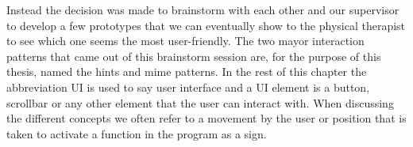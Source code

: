 
Instead the decision was made to brainstorm with each other and our supervisor to develop a few prototypes that we can eventually show to the physical therapist to see which one seems the most user-friendly. The two mayor interaction patterns that came out of this brainstorm session are, for the purpose of this thesis, named the hints and mime patterns. In the rest of this chapter the abbreviation UI is used to say user interface and a UI element is a button, scrollbar or any other element that the user can interact with. When discussing the different concepts we often refer to a movement by the user or position that is taken to activate a function in the program as a sign.\\

